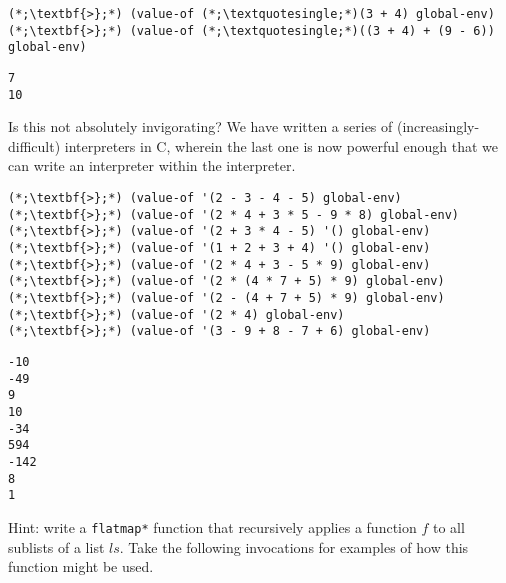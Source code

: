 \begin{clo}[]{}
\begin{lstlisting}[language=MyScheme]
(*;\textbf{>};*) (value-of (*;\textquotesingle;*)(3 + 4) global-env)
(*;\textbf{>};*) (value-of (*;\textquotesingle;*)((3 + 4) + (9 - 6)) global-env)
\end{lstlisting}
\tcblower
\begin{lstlisting}[language=MyOutput]
7
10
\end{lstlisting}
\end{clo}

Is this not absolutely invigorating? We have written a series of (increasingly-difficult) interpreters in C, wherein the last one is now powerful enough that we can write an interpreter within the interpreter.


\begin{clo}[]{}
\begin{lstlisting}[language=MyScheme]
(*;\textbf{>};*) (value-of '(2 - 3 - 4 - 5) global-env)
(*;\textbf{>};*) (value-of '(2 * 4 + 3 * 5 - 9 * 8) global-env)
(*;\textbf{>};*) (value-of '(2 + 3 * 4 - 5) '() global-env)
(*;\textbf{>};*) (value-of '(1 + 2 + 3 + 4) '() global-env)
(*;\textbf{>};*) (value-of '(2 * 4 + 3 - 5 * 9) global-env)
(*;\textbf{>};*) (value-of '(2 * (4 * 7 + 5) * 9) global-env)
(*;\textbf{>};*) (value-of '(2 - (4 + 7 + 5) * 9) global-env)
(*;\textbf{>};*) (value-of '(2 * 4) global-env)
(*;\textbf{>};*) (value-of '(3 - 9 + 8 - 7 + 6) global-env)
\end{lstlisting}
\tcblower
\begin{lstlisting}[language=MyOutput]
-10
-49
9
10
-34
594
-142
8
1
\end{lstlisting}
\end{clo}

Hint: write a \texttt{flatmap*} function that recursively applies a function $f$ to all sublists of a list $\textit{ls}$. Take the following invocations for examples of how this function might be used.

